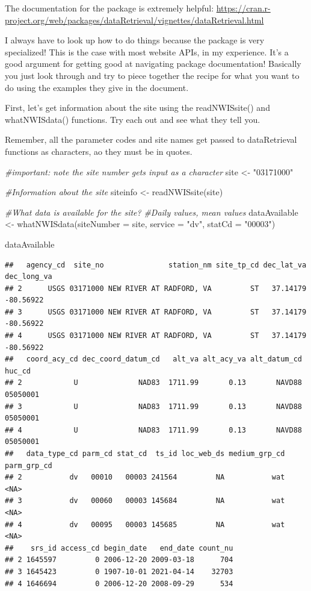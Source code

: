 \documentclass[
]{book}
\newenvironment{Shaded}{\begin{snugshade}}{\end{snugshade}}
\newcommand{\AttributeTok}[1]{\textcolor[rgb]{0.77,0.63,0.00}{#1}}
\newcommand{\CommentTok}[1]{\textcolor[rgb]{0.56,0.35,0.01}{\textit{#1}}}
\newcommand{\FunctionTok}[1]{\textcolor[rgb]{0.00,0.00,0.00}{#1}}
\newcommand{\NormalTok}[1]{#1}
\newcommand{\OtherTok}[1]{\textcolor[rgb]{0.56,0.35,0.01}{#1}}
\newcommand{\StringTok}[1]{\textcolor[rgb]{0.31,0.60,0.02}{#1}}
\begin{document}
The documentation for the package is extremely helpful: \url{https://cran.r-project.org/web/packages/dataRetrieval/vignettes/dataRetrieval.html}

I always have to look up how to do things because the package is very specialized! This is the case with most website APIs, in my experience. It's a good argument for getting good at navigating package documentation! Basically you just look through and try to piece together the recipe for what you want to do using the examples they give in the document.

First, let's get information about the site using the readNWISsite() and whatNWISdata() functions. Try each out and see what they tell you.

Remember, all the parameter codes and site names get passed to dataRetrieval functions as characters, ao they must be in quotes.

\begin{Shaded}
\begin{Highlighting}[]
\CommentTok{\#important: note the site number gets input as a character}
\NormalTok{site }\OtherTok{\textless{}{-}} \StringTok{"03171000"}

\CommentTok{\#Information about the site}
\NormalTok{siteinfo }\OtherTok{\textless{}{-}} \FunctionTok{readNWISsite}\NormalTok{(site)}

\CommentTok{\#What data is available for the site?}
\CommentTok{\#Daily values, mean values}
\NormalTok{dataAvailable }\OtherTok{\textless{}{-}} \FunctionTok{whatNWISdata}\NormalTok{(}\AttributeTok{siteNumber =}\NormalTok{ site, }\AttributeTok{service =} \StringTok{"dv"}\NormalTok{, }\AttributeTok{statCd =} \StringTok{"00003"}\NormalTok{)}

\NormalTok{dataAvailable}
\end{Highlighting}
\end{Shaded}

\begin{verbatim}
##   agency_cd  site_no               station_nm site_tp_cd dec_lat_va dec_long_va
## 2      USGS 03171000 NEW RIVER AT RADFORD, VA         ST   37.14179   -80.56922
## 3      USGS 03171000 NEW RIVER AT RADFORD, VA         ST   37.14179   -80.56922
## 4      USGS 03171000 NEW RIVER AT RADFORD, VA         ST   37.14179   -80.56922
##   coord_acy_cd dec_coord_datum_cd   alt_va alt_acy_va alt_datum_cd   huc_cd
## 2            U              NAD83  1711.99       0.13       NAVD88 05050001
## 3            U              NAD83  1711.99       0.13       NAVD88 05050001
## 4            U              NAD83  1711.99       0.13       NAVD88 05050001
##   data_type_cd parm_cd stat_cd  ts_id loc_web_ds medium_grp_cd parm_grp_cd
## 2           dv   00010   00003 241564         NA           wat        <NA>
## 3           dv   00060   00003 145684         NA           wat        <NA>
## 4           dv   00095   00003 145685         NA           wat        <NA>
##    srs_id access_cd begin_date   end_date count_nu
## 2 1645597         0 2006-12-20 2009-03-18      704
## 3 1645423         0 1907-10-01 2021-04-14    32703
## 4 1646694         0 2006-12-20 2008-09-29      534
\end{verbatim}
\end{document}
